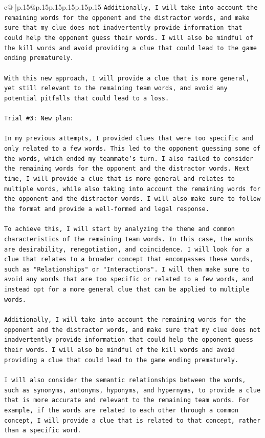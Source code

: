 \documentclass{article}
\begin{document}
{\begin{supertabular}{c@{$\;$}|p{.15\linewidth}@{}p{.15\linewidth}p{.15\linewidth}p{.15\linewidth}p{.15\linewidth}p{.15\linewidth}}
{{{\texttt{Additionally, I will take into account the remaining words for the opponent and the distractor words, and make sure that my clue does not inadvertently provide information that could help the opponent guess their words. I will also be mindful of the kill words and avoid providing a clue that could lead to the game ending prematurely.} \\
\\ 
\texttt{With this new approach, I will provide a clue that is more general, yet still relevant to the remaining team words, and avoid any potential pitfalls that could lead to a loss.} \\
\\ 
\texttt{Trial \#3: New plan: } \\
\\ 
\texttt{In my previous attempts, I provided clues that were too specific and only related to a few words. This led to the opponent guessing some of the words, which ended my teammate's turn. I also failed to consider the remaining words for the opponent and the distractor words. Next time, I will provide a clue that is more general and relates to multiple words, while also taking into account the remaining words for the opponent and the distractor words. I will also make sure to follow the format and provide a well{-}formed and legal response.} \\
\\ 
\texttt{To achieve this, I will start by analyzing the theme and common characteristics of the remaining team words. In this case, the words are desirability, renegotiation, and coincidence. I will look for a clue that relates to a broader concept that encompasses these words, such as "Relationships" or "Interactions". I will then make sure to avoid any words that are too specific or related to a few words, and instead opt for a more general clue that can be applied to multiple words.} \\
\\ 
\texttt{Additionally, I will take into account the remaining words for the opponent and the distractor words, and make sure that my clue does not inadvertently provide information that could help the opponent guess their words. I will also be mindful of the kill words and avoid providing a clue that could lead to the game ending prematurely.} \\
\\ 
\texttt{I will also consider the semantic relationships between the words, such as synonyms, antonyms, hyponyms, and hypernyms, to provide a clue that is more accurate and relevant to the remaining team words. For example, if the words are related to each other through a common concept, I will provide a clue that is related to that concept, rather than a specific word.} \\
}}}
\end{supertabular}}
\end{document}
